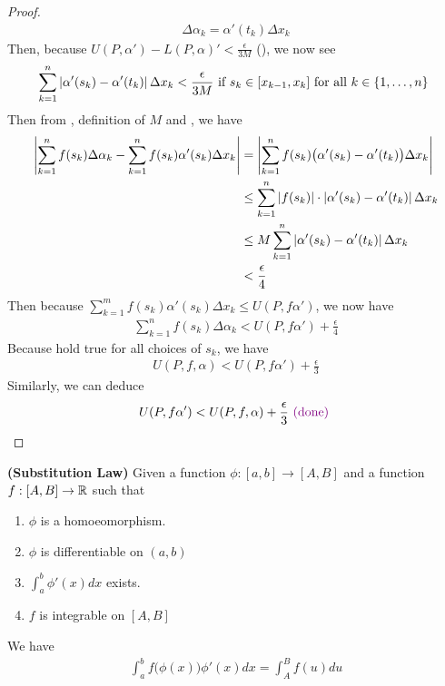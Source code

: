 \documentclass{report}
\begin{document}
\begin{proof}
\begin{align}
\label{CR4}
\Delta \alpha_k=  \alpha' (t_k)\Delta x_k
\end{align}
Then, because $U(P,\alpha ')-L(P,\alpha )'<\frac{\epsilon}{3M}$ (), we now see 
\begin{align}
  \label{CR5}
\sum_{k=1}^n \left|\alpha '(s_k)-\alpha '(t_k)\right| \Delta x_k<\frac{\epsilon}{3M} \text{ if $s_k \in [x_{k-1},x_k]$ for all $k \in \{ 1,\dots , n \}$ }
\end{align}
Then from , definition of $M$ and , we have 
\begin{align*}
\left|\sum_{k=1}^n f(s_k)\Delta \alpha_k - \sum_{k=1}^n f(s_k)\alpha '(s_k)\Delta x_k\right|&=\left|\sum_{k=1}^n f(s_k)\big(\alpha '(s_k)-\alpha '(t_k) \big)\Delta x_k\right|\\
&\leq \sum_{k=1}^n \left|f(s_k)\right|\cdot \left|\alpha '(s_k)-\alpha '(t_k)\right|\Delta x_k\\
&\leq M \sum_{k=1}^n \left|\alpha '(s_k)-\alpha '(t_k)\right|\Delta x_k \\
&<\frac{\epsilon}{4}
\end{align*}
Then because $\sum_{k=1}^m f(s_k)\alpha '(s_k)\Delta x_k\leq  U(P,f\alpha ')$, we now have 
\begin{align}
\label{CR6}
\sum_{k=1}^n f(s_k)\Delta \alpha_k < U(P,f\alpha ')+\frac{\epsilon}{4}
\end{align}
Because  hold true for all choices of  $s_k$, we have 
\begin{align*}
U(P,f,\alpha )<  U(P,f\alpha ')+\frac{\epsilon}{3}
\end{align*}
Similarly, we can deduce 
\begin{align*}
U(P,f\alpha ')<U(P,f,\alpha )+\frac{\epsilon}{3}\textcolor{violet}{\text{ (done) }}
\end{align*}
\end{proof}
\begin{theorem}
\textbf{(Substitution Law)} Given a function $\phi: [a,b]\rightarrow [A,B]$ and a function $f:[A,B]\rightarrow \mathbb{R}$ such that 
\begin{enumerate}[label=(\alph*)]
  \item $\phi$ is a homoeomorphism. 
  \item $\phi$ is differentiable on $(a,b)$ 
  \item $\int_a^b \phi' (x)dx$ exists.  
  \item $f$ is integrable on  $[A,B]$
\end{enumerate}
We have 
\begin{align*}
\int_a^b f\big(\phi (x) \big)\phi' (x)dx=\int_A^B f(u)du
\end{align*}
\end{theorem}
\end{document}
